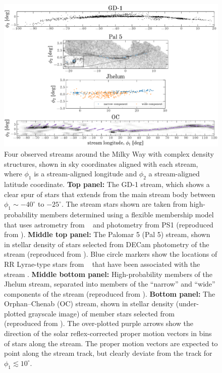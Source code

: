 \documentclass[final,5p,times,twocolumn,authoryear]{elsarticle}
\begin{document}
\begin{figure}[t!]
    \centering
    \includegraphics[width=\textwidth]{figures/stream-density-structure.pdf}
    \caption{
        Four observed streams around the Milky Way with complex density structures,
        shown in sky coordinates aligned with each stream, where $\phi_1$ is a
        stream-aligned longitude and $\phi_2$ a stream-aligned latitude coordinate.
        \textbf{Top panel:} The GD-1 stream, which shows a clear spur of stars that
        extends from the main stream body between $\phi_1 \sim -40^\circ$ to $-25^\circ$.
        The stream stars shown are taken from high-probability members determined using
        a flexible membership model that uses astrometry from \gaia\  and
        photometry from PS1 (reproduced from \citealt{tavangar:2024}).
        \textbf{Middle top panel:} The Palomar 5 (Pal 5) stream, shown in stellar
        density of stars selected from DECam photometry of the stream (reproduced from
        \citealt{bonaca:2019}).
        Blue circle markers show the locations of RR Lyrae-type stars from \gaia\ 
        that have been associated with the stream \citep{price-whelan:2019}.
        \textbf{Middle bottom panel:} High-probability members of the Jhelum stream,
        separated into members of the ``narrow'' and ``wide'' components of the stream
        (reproduced from \citealt{awad:2024}).
        \textbf{Bottom panel:} The Orphan--Chenab (OC) stream, shown in stellar density
        (under-plotted grayscale image) of member stars selected from \gaia\ 
        (reproduced from \citealt{koposov:2023}).
        The over-plotted purple arrows show the direction of the solar reflex-corrected
        proper motion vectors in bins of stars along the stream.
        The proper motion vectors are expected to point along the stream track, but
        clearly deviate from the track for $\phi_1 \lesssim 10^\circ$.
    }
    \label{fig:four-obs-streams}
\end{figure}
\end{document}
